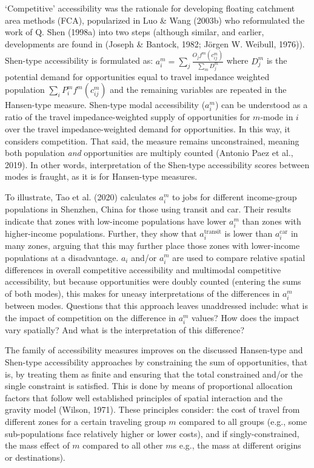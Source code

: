 \documentclass[
11pt, %
oneside, %
english, %
singlespacing, %
]{macthesis} %
\begin{document}
`Competitive' accessibility was the rationale for developing floating catchment area methods (FCA), popularized in Luo \& Wang (2003b) who reformulated the work of Q. Shen (1998a) into two steps (although similar, and earlier, developments are found in (Joseph \& Bantock, 1982; Jörgen W. Weibull, 1976)). Shen-type accessibility is formulated as: \(a_i^m = \sum_j \frac{O_jf^m(c_{ij}^m)}{\sum_m D_j^m}\) where \(D_j^m\) is the potential demand for opportunities equal to travel impedance weighted population \(\sum_i P_i^m f^m(c_{ij}^m)\) and the remaining variables are repeated in the Hansen-type measure. Shen-type modal accessibility (\(a_i^m\)) can be understood as a ratio of the travel impedance-weighted supply of opportunities for \(m\)-mode in \(i\) over the travel impedance-weighted demand for opportunities. In this way, it considers competition. That said, the measure remains unconstrained, meaning both population \emph{and} opportunities are multiply counted (Antonio Paez et al., 2019). In other words, interpretation of the Shen-type accessibility scores between modes is fraught, as it is for Hansen-type measures.

To illustrate, Tao et al. (2020) calculates \(a_i^m\) to jobs for different income-group populations in Shenzhen, China for those using transit and car. Their results indicate that zones with low-income populations have lower \(a_i^m\) than zones with higher-income populations. Further, they show that \(a_i^{\text{transit}}\) is lower than \(a_i^{\text{car}}\) in many zones, arguing that this may further place those zones with lower-income populations at a disadvantage. \(a_i\) and/or \(a_i^m\) are used to compare relative spatial differences in overall competitive accessibility and multimodal competitive accessibility, but because opportunities were doubly counted (entering the sums of both modes), this makes for uneasy interpretations of the differences in \(a_i^{m}\) between modes. Questions that this approach leaves unaddressed include: what is the impact of competition on the difference in \(a_i^m\) values? How does the impact vary spatially? And what is the interpretation of this difference?

The family of accessibility measures improves on the discussed Hansen-type and Shen-type accessibility approaches by constraining the sum of opportunities, that is, by treating them as finite and ensuring that the total constrained and/or the single constraint is satisfied. This is done by means of proportional allocation factors that follow well established principles of spatial interaction and the gravity model (Wilson, 1971). These principles consider: the cost of travel from different zones for a certain traveling group \(m\) compared to all groups (e.g., some sub-populations face relatively higher or lower costs), and if singly-constrained, the mass effect of \(m\) compared to all other \(m\)s e.g., the mass at different origins or destinations).
\end{document}
